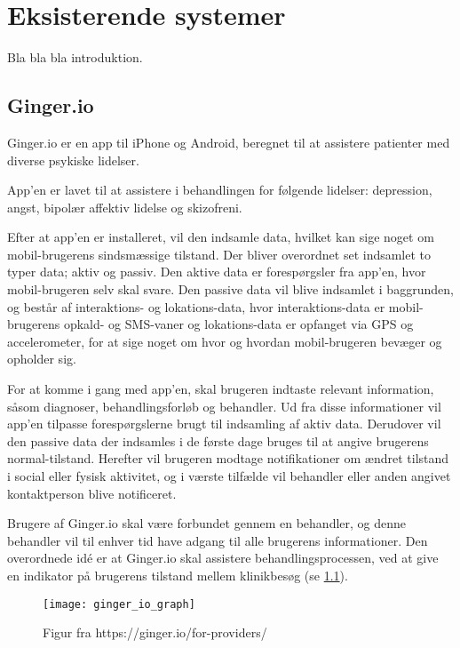 \chapter{Eksisterende systemer}
Bla bla bla introduktion.

\section{Ginger.io}
Ginger.io er en app til iPhone og Android, beregnet til at assistere patienter med diverse psykiske lidelser.\cite{ginger_dot_io}\cite{gingerio_mit}\cite{gingerio_dailymail}


App'en er lavet til at assistere i behandlingen for følgende lidelser: depression, angst, bipolær affektiv lidelse og skizofreni.

Efter at app'en er installeret, vil den indsamle data, hvilket kan sige noget om mobil-brugerens sindsmæssige tilstand.
Der bliver overordnet set indsamlet to typer data; aktiv og passiv.
Den aktive data er forespørgsler fra app'en, hvor mobil-brugeren selv skal svare.
Den passive data vil blive indsamlet i baggrunden, og består af interaktions- og lokations-data, hvor interaktions-data er mobil-brugerens opkald- og SMS-vaner og lokations-data er opfanget via GPS og accelerometer, for at sige noget om hvor og hvordan mobil-brugeren bevæger og opholder sig.

For at komme i gang med app'en, skal brugeren indtaste relevant information, såsom diagnoser, behandlingsforløb og behandler.
Ud fra disse informationer vil app'en tilpasse forespørgslerne brugt til indsamling af aktiv data.
Derudover vil den passive data der indsamles i de første dage bruges til at angive brugerens normal-tilstand.
Herefter vil brugeren modtage notifikationer om ændret tilstand i social eller fysisk aktivitet, og i værste tilfælde vil behandler eller anden angivet kontaktperson blive notificeret.

Brugere af Ginger.io skal være forbundet gennem en behandler, og denne behandler vil til enhver tid have adgang til alle brugerens informationer.
Den overordnede idé er at Ginger.io skal assistere behandlingsprocessen, ved at give en indikator på brugerens tilstand mellem klinikbesøg (se \cref{eksisterende_systemer:ginger_io_graf}).

\begin{figure}[h]
\centering
\texttt{[image: ginger\_io\_graph]}
\caption{Figur fra https://ginger.io/for-providers/}
\label{eksisterende_systemer:ginger_io_graf}
\end{figure}

